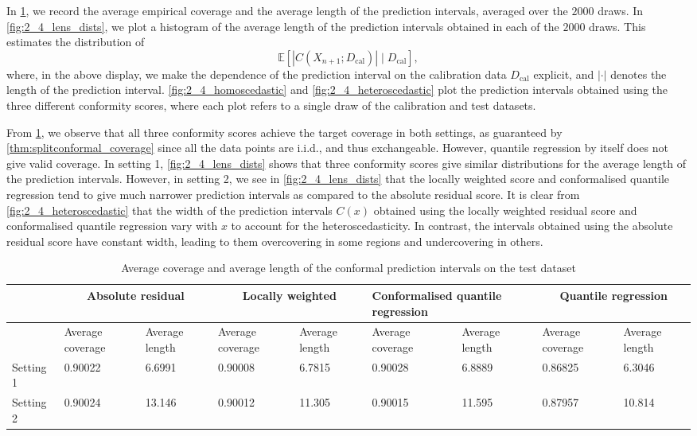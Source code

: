\documentclass[11pt, titlepage]{article} %
\newcommand{\R}{\mathrm}
\newcommand{\Exp}[3]{\mathbb{E}\left#2 #1 \right#3}
\numberwithin{equation}{section}
\theoremstyle{definition}
\numberwithin{theorem}{section}
\numberwithin{lemma}{section}
\numberwithin{corollary}{section}
\numberwithin{proposition}{section}
\numberwithin{definition}{section}
\numberwithin{remark}{section}
\begin{document}
\noindent
In \cref{tab:2_4_settings1_2_results}, we record the average empirical coverage and the average length of the prediction intervals, averaged over the \(2000\) draws. 
In \cref{fig:2_4_lens_dists}, we plot a histogram of the average length of the prediction intervals obtained in each of the \(2000\) draws. This estimates the distribution of \[\Exp{|C(X_{n+1}; D_\R{cal})| \mid D_\R{cal}}{[}{]},\] where, in the above display, we make the dependence of the prediction interval on the calibration data \(D_\R{cal}\) explicit, and \(|\cdot|\) denotes the length of the prediction interval. \cref{fig:2_4_homoscedastic} and \cref{fig:2_4_heteroscedastic} plot the prediction intervals obtained using the three different conformity scores, where each plot refers to a single draw of the calibration and test datasets. \vskip5pt

\noindent
From \cref{tab:2_4_settings1_2_results}, we observe that all three conformity scores achieve the target coverage in both settings, as guaranteed by \cref{thm:splitconformal_coverage} since all the data points are i.i.d., and thus exchangeable. However, quantile regression by itself does not give valid coverage. In setting 1, \cref{fig:2_4_lens_dists} shows that three conformity scores give similar distributions for the average length of the prediction intervals. However, in setting 2, we see in \cref{fig:2_4_lens_dists} that the locally weighted score and conformalised quantile regression tend to give much narrower prediction intervals as compared to the absolute residual score. It is clear from \cref{fig:2_4_heteroscedastic} that the width of the prediction intervals \(C(x)\) obtained using the locally weighted residual score and conformalised quantile regression vary with \(x\) to account for the heteroscedasticity. In contrast, the intervals obtained using the absolute residual score have constant width, leading to them overcovering in some regions and undercovering in others.

\begin{table}[H]
    \centering
    \renewcommand{\arraystretch}{1.2}
    \begin{tabular}{|p{1.2cm}|p{1.5cm}|p{1.5cm}|p{1.5cm}|p{1.5cm}|p{1.5cm}|p{1.5cm}|p{1.5cm}|p{1.5cm}|}
        \hline
        & \multicolumn{2}{c|}{Absolute residual} & \multicolumn{2}{c|}{Locally weighted} & \multicolumn{2}{p{3.5cm}|}{Conformalised quantile regression} & \multicolumn{2}{c|}{Quantile regression} \\
        \hline
        & Average coverage & Average length & Average coverage & Average length & Average coverage & Average length & Average coverage & Average length\\
        \hline
        Setting 1 & 0.90022 & 6.6991 & 0.90008 & 6.7815 & 0.90028 & 6.8889 & 0.86825 & 6.3046 \\
        \hline
        Setting 2 & 0.90024 & 13.146 & 0.90012 & 11.305 & 0.90015 & 11.595 & 0.87957 & 10.814 \\
        \hline
    \end{tabular}
    \caption{Average coverage and average length of the conformal prediction intervals on the test dataset}
    \label{tab:2_4_settings1_2_results}
\end{table}
\end{document}
